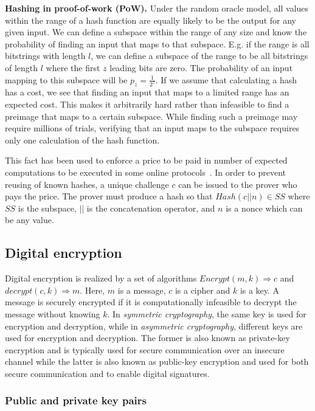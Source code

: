 \noindent
{\bf Hashing in proof-of-work (PoW).}
Under the random oracle model, all values within the range of a hash function are equally likely to be the output for any given input. We can define a subspace within the range of any size and know the probability of finding an input that maps to that subspace. E.g. if the range is all bitstrings with length $l$, we can define a subspace of the range to be all bitstrings of length $l$ where the first $z$ leading bits are zero. The probability of an input mapping to this subspace will be $p_z=\frac{1}{2^z}$. If we assume that calculating a hash has a cost, we see that finding an input that maps to a limited range has an expected cost. This makes it arbitrarily hard rather than infeasible to find a preimage that maps to a certain subspace. While finding such a preimage may require millions of trials, verifying that an input maps to the subspace requires only one calculation of the hash function.  

This fact has been used to enforce a price to be paid in number of expected computations to be executed in some online protocols~\cite{dwork_pricing_1993,back_hashcash-denial_2002}. In order to prevent reusing of known hashes, a unique challenge $c$ can be issued to the prover who pays the price. The prover must produce a hash so that $Hash(c || n) \in SS$ where $SS$ is the subspace, $||$ is the concatenation operator, and $n$ is a nonce which can be any value. 


\subsection{Digital encryption}

Digital encryption is realized by a set of algorithms $Encrypt(m, k) \Rightarrow c$ and $decrypt(c, k) \Rightarrow m$. Here, $m$ is a message, $c$ is a cipher and $k$ is a key. A message is securely encrypted if it is computationally infeasible to decrypt the message without knowing $k$. In \emph{symmetric cryptography}, the same key is used for encryption and decryption, while in \emph{asymmetric cryptography}, different keys are used for encryption and decryption. The former is also known as private-key encryption and is typically used for secure communication over an insecure channel while the latter is also known as public-key encryption and used for both secure communication and to enable digital signatures.

\subsubsection{Public and private key pairs}

